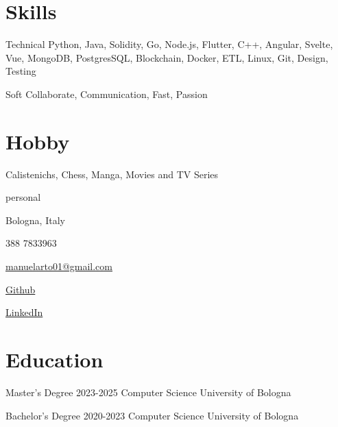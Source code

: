 \documentclass{tccv}
\begin{document}
\section{Skills}

\begin{factlist}

\item{Technical}
     {Python, Java, Solidity, Go, Node.js, Flutter, C++, Angular, Svelte, Vue, MongoDB, PostgresSQL, Blockchain, Docker, ETL, Linux, Git, Design, Testing}

\item{Soft}
     {Collaborate, Communication, Fast, Passion}

\end{factlist}

\section{Hobby}

Calistenichs, Chess, Manga, Movies and TV Series

\newpage

\begin{keyvaluelist}{personal}
    \item[\faHome] Bologna, Italy
    \item[\faPhone] 388 7833963
    \item[\faEnvelope] \href{mailto:manuelarto01@gmail.com}{manuelarto01@gmail.com}
    \item[\faGithub] \href{https://github.com/manuelarto}{Github}
    \item[\faLinkedin] \href{https://www.linkedin.com/in/manuel-arto-696012203/}{LinkedIn}
\end{keyvaluelist}

\section{Education}

\begin{yearlist}

\item[Master's Degree]{2023-2025}
     {Computer Science}
     {University of Bologna}

\item[Bachelor's Degree]{2020-2023}
    {Computer Science}
    {University of Bologna}

\end{yearlist}
\end{document}
